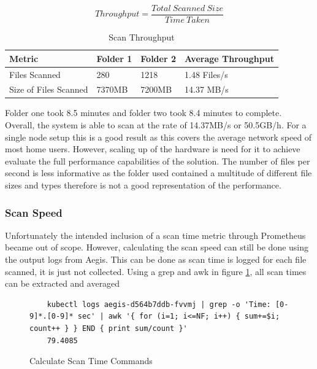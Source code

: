 \documentclass[12pt, conference, final, a4paper, onecolumn, compsoc]{IEEEtran}
\begin{document}
\begin{equation}
  \label{eq:throughput}
  Throughput = \frac{Total\ Scanned\ Size}{Time\ Taken}
\end{equation}

\begin{table}[H] \centering
  \begin{tabular}{|l|l|l|l|}
    \hline
    \textbf{Metric}       & \textbf{Folder 1} & \textbf{Folder 2} & \textbf{Average Throughput}\\ \hline
    Files Scanned         & 280          &   1218         & 1.48 Files/s        \\\hline
    Size of Files Scanned & 7370MB       &   7200MB       & 14.37 MB/s \\
    \hline
  \end{tabular}
  \caption{Scan Throughput}
  \label{tab:scan_throughput}
\end{table}

Folder one took 8.5 minutes and folder two took 8.4 minutes to complete.
Overall, the system is able to scan at the rate of 14.37MB/s or 50.5GB/h. For a
single node setup this is a good result as this covers the average network speed
of most home users. However, scaling up of the hardware is need for it to
achieve evaluate the full performance capabilities of the solution. The number of
files per second is less informative as the folder used contained a multitude of
different file sizes and types therefore is not a good representation of the
performance.

\subsubsection*{Scan Speed}
Unfortunately the intended inclusion of a scan time metric through Prometheus
became out of scope. However, calculating the scan speed can still be done using
the output logs from Aegis. This can be done as scan time is logged for each
file scanned, it is just not collected. Using a grep and awk in figure \ref{fig:scan-time-commands}, all scan times
can be extracted and averaged

\begin{figure}[H]
  \begin{lstlisting}
    kubectl logs aegis-d564b7ddb-fvvmj | grep -o 'Time: [0-9]*.[0-9]* sec' | awk '{ for (i=1; i<=NF; i++) { sum+=$i; count++ } } END { print sum/count }'
    79.4085
  \end{lstlisting}
    \caption{Calculate Scan Time Commands}
    \label{fig:scan-time-commands}
\end{figure}
\end{document}
